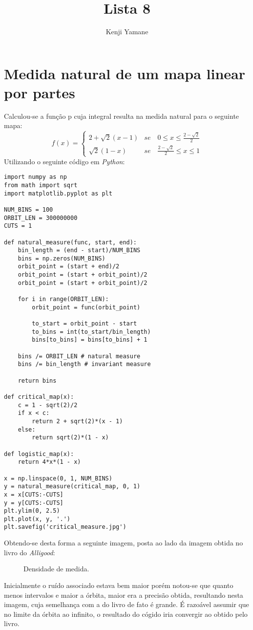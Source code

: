 \documentclass{article}[twocolumn]
\title{Lista 8}
\author{Kenji Yamane}
\begin{document}
	\maketitle
	\section{Medida natural de um mapa linear por partes}
	Calculou-se a fun\c{c}\~ao p cuja integral resulta na medida
	natural para o seguinte mapa:
	\begin{equation}
		f(x) = \left\{\begin{array}{ll}
			2 + \sqrt{2}(x - 1) & se \quad 0 \leq x \leq \frac{2 - \sqrt{2}}{2}\\
			\sqrt{2}(1 - x) & se \quad \frac{2 - \sqrt{2}}{2} \leq x \leq 1
		\end{array}\right.
		\nonumber
	\end{equation}
	Utilizando o seguinte c\'odigo em \textit{Python}:
	\begin{verbatim}
import numpy as np
from math import sqrt
import matplotlib.pyplot as plt

NUM_BINS = 100
ORBIT_LEN = 300000000
CUTS = 1

def natural_measure(func, start, end):
    bin_length = (end - start)/NUM_BINS
    bins = np.zeros(NUM_BINS)
    orbit_point = (start + end)/2
    orbit_point = (start + orbit_point)/2
    orbit_point = (start + orbit_point)/2

    for i in range(ORBIT_LEN):
        orbit_point = func(orbit_point)
        		
        to_start = orbit_point - start
        to_bins = int(to_start/bin_length)
        bins[to_bins] = bins[to_bins] + 1
	
    bins /= ORBIT_LEN # natural measure
    bins /= bin_length # invariant measure
    
    return bins

def critical_map(x):
    c = 1 - sqrt(2)/2
    if x < c:
        return 2 + sqrt(2)*(x - 1)
    else:
        return sqrt(2)*(1 - x)

def logistic_map(x):
    return 4*x*(1 - x)

x = np.linspace(0, 1, NUM_BINS)
y = natural_measure(critical_map, 0, 1)
x = x[CUTS:-CUTS]
y = y[CUTS:-CUTS]
plt.ylim(0, 2.5)
plt.plot(x, y, '.')
plt.savefig('critical_measure.jpg')

	\end{verbatim}
	Obtendo-se desta forma a seguinte imagem, posta ao lado da imagem obtida no livro
	do \textit{Alligood}:
	\begin{figure}[H]
		\centering
		\caption{Densidade de medida.}
	\end{figure}
	Inicialmente o ru\'ido associado estava bem maior por\'em notou-se que quanto
	menos intervalos e maior a \'orbita, maior era a precis\~ao obtida, resultando nesta
	imagem, cuja semelhan\c{c}a com a do livro de fato \'e grande. \'E razo\'avel assumir que
	no limite da \'orbita ao infinito, o resultado do c\'ogido iria convergir ao obtido
	pelo livro.
\end{document}
